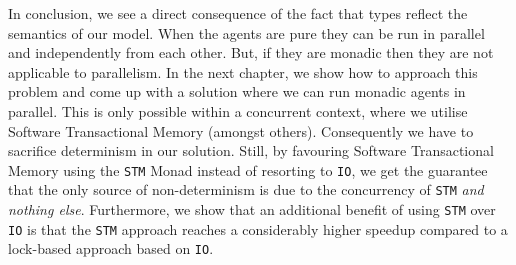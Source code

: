 In conclusion, we see a direct consequence of the fact that types reflect the semantics of our model. When the agents are pure they can be run in parallel and independently from each other. But, if they are monadic then they are not applicable to parallelism. In the next chapter, we show how to approach this problem and come up with a solution where we can run monadic agents in parallel. This is only possible within a concurrent context, where we utilise Software Transactional Memory (amongst others). Consequently we have to sacrifice determinism in our solution. Still, by favouring Software Transactional Memory using the \texttt{STM} Monad instead of resorting to \texttt{IO}, we get the guarantee that the only source of non-determinism is due to the concurrency of \texttt{STM} \textit{and nothing else}. Furthermore, we show that an additional benefit of using \texttt{STM} over \texttt{IO} is that the \texttt{STM} approach reaches a considerably higher speedup compared to a lock-based approach based on \texttt{IO}. 